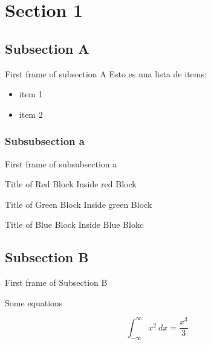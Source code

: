 \section{Section 1}
\subsection{Subsection A}

\begin{frame}{First frame of subsection A}
    Esto es una lista de items:
    \begin{itemize}
        \item item 1
        \item item 2
    \end{itemize}
\end{frame}

\subsubsection{Subsubsection a}

\begin{frame}{First frame of subsubsection a}
    \begin{redblock}{Title of Red Block}
        Inside red Block
    \end{redblock}
    
    \begin{greenblock}{Title of Green Block}
        Inside green Block
    \end{greenblock}
    
    \begin{blueblock}{Title of Blue Block}
    Inside Blue Blokc
    \end{blueblock}
    
\end{frame}

\subsection{Subsection B}

\begin{frame}{First frame of Subsection B}

Some equations

\begin{equation}
    \displaystyle\int^\infty_{-\infty} x^2 ~dx = \frac{x^3}{3}
\end{equation}


\end{frame}
